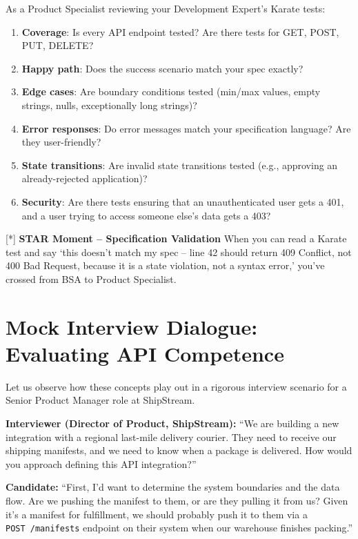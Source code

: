 \documentclass[
  11pt,
  openany,
  oneside]{book}
\providecommand{\tightlist}{%
  \setlength{\itemsep}{0pt}\setlength{\parskip}{0pt}}
\renewenvironment{quote}{\begin{customquote}}{\end{customquote}}
\begin{document}
As a Product Specialist reviewing your Development Expert's Karate
tests:

\begin{enumerate}
\def\labelenumi{\arabic{enumi}.}
\tightlist
\item
  \textbf{Coverage}: Is every API endpoint tested? Are there tests for
  GET, POST, PUT, DELETE?
\item
  \textbf{Happy path}: Does the success scenario match your spec
  exactly?
\item
  \textbf{Edge cases}: Are boundary conditions tested (min/max values,
  empty strings, nulls, exceptionally long strings)?
\item
  \textbf{Error responses}: Do error messages match your specification
  language? Are they user-friendly?
\item
  \textbf{State transitions}: Are invalid state transitions tested
  (e.g., approving an already-rejected application)?
\item
  \textbf{Security}: Are there tests ensuring that an unauthenticated
  user gets a 401, and a user trying to access someone else's data gets
  a 403?
\end{enumerate}

\begin{quote}
{[}*{]} \textbf{STAR Moment -- Specification Validation} When you can
read a Karate test and say `this doesn't match my spec -- line 42 should
return 409 Conflict, not 400 Bad Request, because it is a state
violation, not a syntax error,' you've crossed from BSA to Product
Specialist.
\end{quote}

\section{Mock Interview Dialogue: Evaluating API
Competence}\label{mock-interview-dialogue-evaluating-api-competence}

Let us observe how these concepts play out in a rigorous interview
scenario for a Senior Product Manager role at ShipStream.

\textbf{Interviewer (Director of Product, ShipStream):} ``We are
building a new integration with a regional last-mile delivery courier.
They need to receive our shipping manifests, and we need to know when a
package is delivered. How would you approach defining this API
integration?''

\textbf{Candidate:} ``First, I'd want to determine the system boundaries
and the data flow. Are we pushing the manifest to them, or are they
pulling it from us? Given it's a manifest for fulfillment, we should
probably push it to them via a \texttt{POST\ /manifests} endpoint on
their system when our warehouse finishes packing.''
\end{document}
